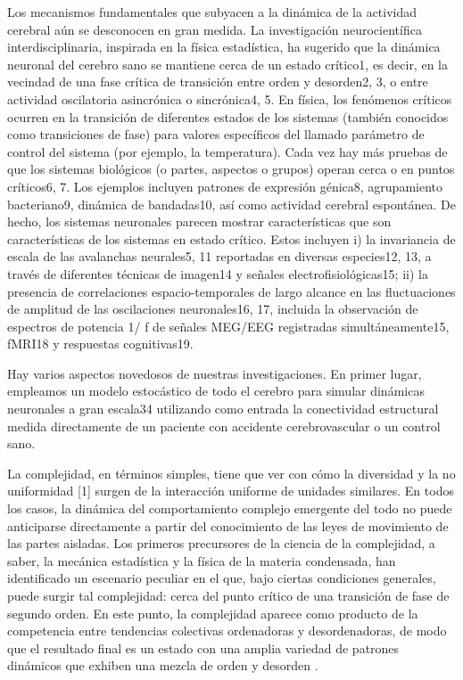 Los mecanismos fundamentales que subyacen a la dinámica de la actividad cerebral aún se desconocen en gran medida. La investigación neurocientífica interdisciplinaria, inspirada en la física estadística, ha sugerido que la dinámica neuronal del cerebro sano se mantiene cerca de un estado crítico1, es decir, en la vecindad de una fase crítica de transición entre orden y desorden2, 3, o entre actividad oscilatoria asincrónica o sincrónica4, 5. En física, los fenómenos críticos ocurren en la transición de diferentes estados de los sistemas (también conocidos como transiciones de fase) para valores específicos del llamado parámetro de control del sistema (por ejemplo, la temperatura). Cada vez hay más pruebas de que los sistemas biológicos (o partes, aspectos o grupos) operan cerca o en puntos críticos6, 7. Los ejemplos incluyen patrones de expresión génica8, agrupamiento bacteriano9, dinámica de bandadas10, así como actividad cerebral espontánea. De hecho, los sistemas neuronales parecen mostrar características que son características de los sistemas en estado crítico. Estos incluyen i) la invariancia de escala de las avalanchas neurales5, 11 reportadas en diversas especies12, 13, a través de diferentes técnicas de imagen14 y señales electrofisiológicas15; ii) la presencia de correlaciones espacio-temporales de largo alcance en las fluctuaciones de amplitud de las oscilaciones neuronales16, 17, incluida la observación de espectros de potencia 1/ f de señales MEG/EEG registradas simultáneamente15, fMRI18 y respuestas cognitivas19.

Hay varios aspectos novedosos de nuestras investigaciones. En primer lugar, empleamos un modelo estocástico de todo el cerebro para simular dinámicas neuronales a gran escala34 utilizando como entrada la conectividad estructural medida directamente de un paciente con accidente cerebrovascular o un control sano.



La complejidad, en términos simples, tiene que ver con cómo la diversidad y la no uniformidad [1] surgen de la interacción uniforme de unidades similares. En todos los casos, la dinámica del comportamiento complejo emergente del todo no puede anticiparse directamente a partir del conocimiento de las leyes de movimiento de las partes aisladas. Los primeros precursores de la ciencia de la complejidad, a saber, la mecánica estadística y la física de la materia condensada, han identificado un escenario peculiar en el que, bajo ciertas condiciones generales, puede surgir tal complejidad: cerca del punto crítico de una transición de fase de segundo orden. En este punto, la complejidad aparece como producto de la competencia entre tendencias colectivas ordenadoras y desordenadoras, de modo que el resultado final es un estado con una amplia variedad de patrones dinámicos que exhiben una mezcla de orden y desorden \cite{tagliazucchi_brain_2013}.

